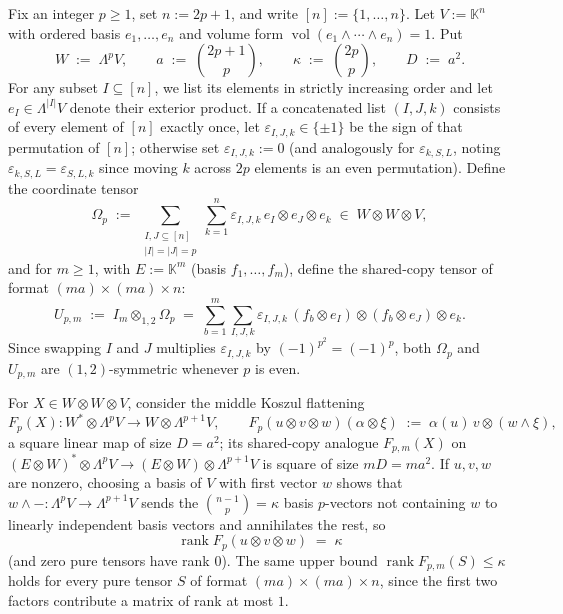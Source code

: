 \documentclass[11pt,reqno]{amsart}
\theoremstyle{definition}
\theoremstyle{remark}
\numberwithin{equation}{section}
\newcommand{\KK}{\mathbb{K}}
\DeclareMathOperator{\rk}{rank}
\DeclareMathOperator{\vol}{vol}
\begin{document}
Fix an integer $p \ge 1$, set $n := 2p + 1$, and write $[n] := \{1, \dots, n\}$. Let $V := \KK^n$ with ordered basis $e_1, \dots, e_n$ and volume form $\vol(e_1 \wedge \cdots \wedge e_n) = 1$. Put
\[
  W \;:=\; \Lambda^p V, \qquad a \;:=\; \binom{2p + 1}{p}, \qquad \kappa \;:=\; \binom{2p}{p}, \qquad D \;:=\; a^2.
\]
For any subset $I \subseteq [n]$, we list its elements in strictly increasing order and let $e_I \in \Lambda^{|I|} V$ denote their exterior product. If a concatenated list $(I, J, k)$ consists of every element of $[n]$ exactly once, let $\varepsilon_{I,J,k} \in \{\pm 1\}$ be the sign of that permutation of $[n]$; otherwise set $\varepsilon_{I,J,k} := 0$ (and analogously for $\varepsilon_{k,S,L}$, noting $\varepsilon_{k,S,L} = \varepsilon_{S,L,k}$ since moving $k$ across $2p$ elements is an even permutation). Define the coordinate tensor
\begin{equation}\label{eq:Omega-p-def}
  \Omega_p \;:=\; \sum_{\substack{I, J \subseteq [n] \\ |I| = |J| = p}} \sum_{k=1}^n \varepsilon_{I,J,k}\, e_I \otimes e_J \otimes e_k \;\in\; W \otimes W \otimes V,
\end{equation}
and for $m \ge 1$, with $E := \KK^m$ (basis $f_1, \dots, f_m$), define the shared-copy tensor of format $(m a) \times (m a) \times n$:
\begin{equation}\label{eq:Upm-def}
  U_{p,m} \;:=\; I_m \otimes_{1,2} \Omega_p \;=\; \sum_{b=1}^m \sum_{I, J, k} \varepsilon_{I,J,k}\, (f_b \otimes e_I) \otimes (f_b \otimes e_J) \otimes e_k.
\end{equation}
Since swapping $I$ and $J$ multiplies $\varepsilon_{I,J,k}$ by $(-1)^{p^2} = (-1)^p$, both $\Omega_p$ and $U_{p,m}$ are $(1,2)$-symmetric whenever $p$ is even.

For $X \in W \otimes W \otimes V$, consider the middle Koszul flattening
\begin{equation}\label{eq:Fp-def}
  F_p(X) : W^* \otimes \Lambda^p V \longrightarrow W \otimes \Lambda^{p+1} V, \qquad
  F_p(u \otimes v \otimes w)(\alpha \otimes \xi) \;:=\; \alpha(u)\, v \otimes (w \wedge \xi),
\end{equation}
a square linear map of size $D = a^2$; its shared-copy analogue $F_{p,m}(X)$ on $(E \otimes W)^* \otimes \Lambda^p V \to (E \otimes W) \otimes \Lambda^{p+1} V$ is square of size $m D = m a^2$. If $u, v, w$ are nonzero, choosing a basis of $V$ with first vector $w$ shows that $w \wedge - : \Lambda^p V \to \Lambda^{p+1} V$ sends the $\binom{n-1}{p} = \kappa$ basis $p$-vectors not containing $w$ to linearly independent basis vectors and annihilates the rest, so
\begin{equation}\label{eq:Fp-pure-rank}
  \rk F_p(u \otimes v \otimes w) \;=\; \kappa
\end{equation}
(and zero pure tensors have rank $0$). The same upper bound $\rk F_{p,m}(S) \le \kappa$ holds for every pure tensor $S$ of format $(m a) \times (m a) \times n$, since the first two factors contribute a matrix of rank at most $1$.
\end{document}

